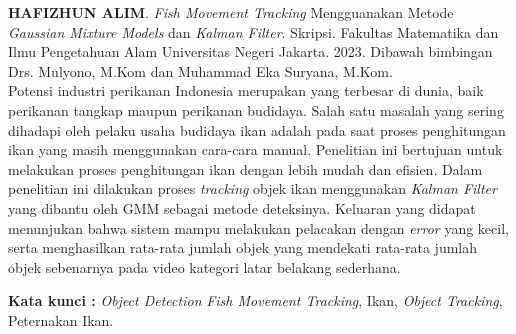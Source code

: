 \begin{abstractind}

\textbf{HAFIZHUN ALIM}. \textit{Fish Movement Tracking} Mengguanakan Metode \textit{Gaussian Mixture Models} dan \textit{Kalman Filter}. Skripsi. Fakultas Matematika dan Ilmu Pengetahuan Alam Universitas Negeri Jakarta. 2023. Dibawah bimbingan Drs. Mulyono, M.Kom dan Muhammad Eka Suryana, M.Kom.\\

Potensi industri perikanan Indonesia merupakan yang terbesar di dunia, baik perikanan tangkap maupun perikanan budidaya. Salah satu masalah yang sering dihadapi oleh pelaku usaha budidaya ikan adalah pada saat proses penghitungan ikan yang masih menggunakan cara-cara manual. Penelitian ini bertujuan untuk melakukan proses penghitungan ikan dengan lebih mudah dan efisien. Dalam penelitian ini dilakukan proses \textit{tracking} objek ikan menggunakan \textit{Kalman Filter} yang dibantu oleh GMM sebagai metode deteksinya. Keluaran yang didapat menunjukan bahwa sistem mampu melakukan pelacakan dengan \textit{error} yang kecil, serta menghasilkan rata-rata jumlah objek yang mendekati rata-rata jumlah objek sebenarnya pada video kategori latar belakang sederhana.

\vspace{0.5cm}
\noindent
\textbf{Kata kunci :} \emph{Object Detection} \emph{Fish Movement Tracking}, Ikan, \emph{Object Tracking}, Peternakan Ikan. \\

\end{abstractind}

